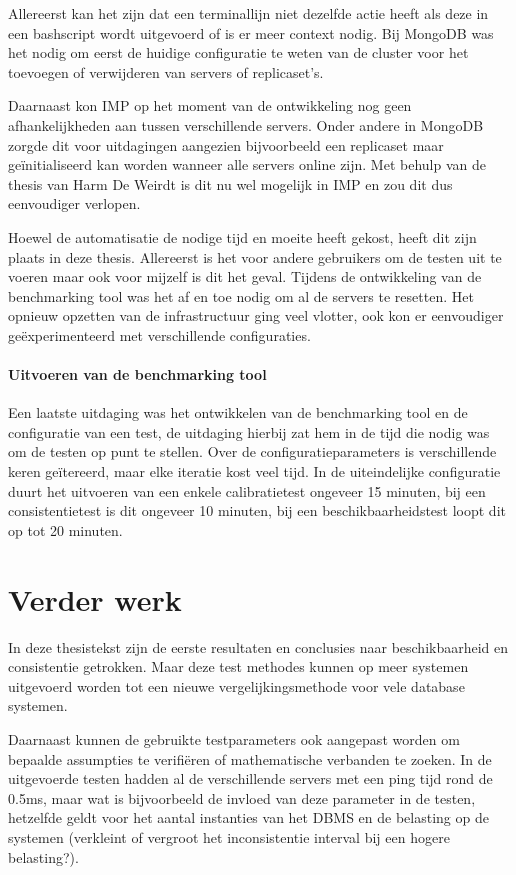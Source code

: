 Allereerst kan het zijn dat een terminallijn niet dezelfde actie heeft als deze in een bashscript wordt uitgevoerd of is er meer context nodig. Bij MongoDB was het nodig om eerst de huidige configuratie te weten van de cluster voor het toevoegen of verwijderen van servers of replicaset's. 

Daarnaast kon IMP op het moment van de ontwikkeling nog geen afhankelijkheden aan tussen verschillende servers. Onder andere in MongoDB zorgde dit voor uitdagingen aangezien bijvoorbeeld een replicaset maar geïnitialiseerd kan worden wanneer alle servers online zijn. Met behulp van de thesis van Harm De Weirdt\cite{thesisHarm} is dit nu wel mogelijk in IMP en zou dit dus eenvoudiger verlopen. 

Hoewel de automatisatie de nodige tijd en moeite heeft gekost, heeft dit zijn plaats in deze thesis. Allereerst is het voor andere gebruikers om de testen uit te voeren maar ook voor mijzelf is dit het geval. Tijdens de ontwikkeling van de benchmarking tool was het af en toe nodig om al de servers te resetten. Het opnieuw opzetten van de infrastructuur ging veel vlotter, ook kon er eenvoudiger geëxperimenteerd met verschillende configuraties. 

\paragraph{Uitvoeren van de benchmarking tool} Een laatste uitdaging was het ontwikkelen van de benchmarking tool en de configuratie van een test, de uitdaging hierbij zat hem in de tijd die nodig was om de testen op punt te stellen. Over de configuratieparameters is verschillende keren geïtereerd, maar elke iteratie kost veel tijd. In de uiteindelijke configuratie duurt het uitvoeren van een enkele calibratietest ongeveer 15 minuten, bij een consistentietest is dit ongeveer 10 minuten, bij een beschikbaarheidstest loopt dit op tot 20 minuten. 

\section{Verder werk}
In deze thesistekst zijn de eerste resultaten en conclusies naar beschikbaarheid en consistentie getrokken. Maar deze test methodes kunnen op meer systemen uitgevoerd worden tot een nieuwe vergelijkingsmethode voor vele database systemen.

Daarnaast kunnen de gebruikte testparameters ook aangepast worden om bepaalde assumpties te verifiëren of mathematische verbanden te zoeken. In de uitgevoerde testen hadden al de verschillende servers met een ping tijd rond de 0.5ms, maar wat is bijvoorbeeld de invloed van deze parameter in de testen, hetzelfde geldt voor het aantal instanties van het DBMS en de belasting op de systemen (verkleint of vergroot het inconsistentie interval bij een hogere belasting?). 

